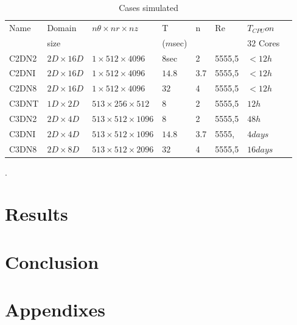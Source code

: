 \documentclass[%
 aip,
 amsmath,amssymb,
 reprint,%
]{revtex4-1}
\begin{document}
\begin{table}
\caption{\label{TB0030} Cases simulated}
\begin{tabular}{l|lllllll}
	Name & Domain & $n\theta \times nr \times nz $ & T & n & Re & $T_{CPU} on $\\ 
	     & size   &                               &($m$sec) &  &  & $32$ Cores\\ \hline
	C2DN2 & $2D \times 16D$ & $1 \times 512 \times  4096 $ & $8$sec & 2 & 5555,5 & $ <12h$ \\ \hline
	C2DNI & $2D \times 16D$ & $1 \times 512 \times  4096 $ & $14.8$ & 3.7 & 5555,5 & $ <12h$ \\ \hline
	C2DN8 & $2D \times 16D$ & $1 \times 512 \times  4096 $ & $32$ & 4 & 5555,5 & $ <12h$ \\ \hline
	C3DNT & $1D \times  2D$ & $513 \times 256 \times   512 $ & $8$ & 2 & 5555,5 & $12h$ \\ \hline
	C3DN2 & $2D \times  4D$ & $513 \times 512 \times  1096 $ & $8$ & 2 & 5555,5 & $48h$ \\ \hline
	C3DNI & $2D \times  4D$ & $513 \times 512 \times  1096 $ & $14.8$ & 3.7 & 5555,& $ 4days$ \\ \hline
	C3DN8 & $2D \times  8D$ & $513 \times 512 \times  2096 $ & $32$ & 4 & 5555,5  & $ 16days$ \\ \hline
\end{tabular}
\end{table}




 \cite{Zayas2012} \cite{Verma2020} \cite{PrasannaSimha2020} \cite{Duguid1946}.

\section{\label{sec:Intro}Results}
\section{\label{sec:Intro}Conclusion}


\begin{acknowledgments}
\end{acknowledgments}

\appendix

\section{Appendixes}

\nocite{*}
\end{document}
